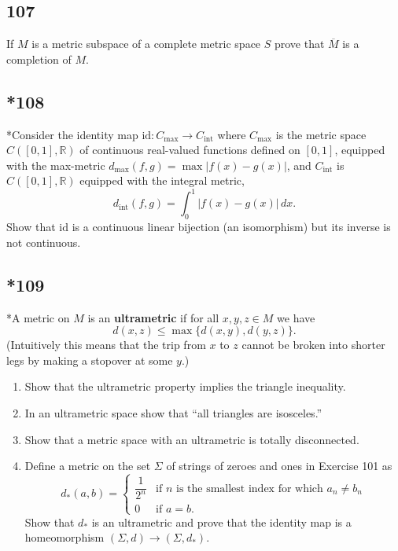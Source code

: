 \documentclass{amsart}
\begin{document}
\subsection*{107}
If $M$ is a metric subspace of a complete metric space $S$ prove that $\overline{M}$ is a completion of $M$.

\subsection*{*108}
*Consider the identity map $\mathrm{id} : C_{\max} \to C_{\mathrm{int}}$ where $C_{\max}$ is the metric space $C([0,1],\mathbb{R})$ of continuous real-valued functions defined on $[0,1]$, equipped with the max-metric $d_{\max}(f,g) = \max|f(x)-g(x)|$, and $C_{\mathrm{int}}$ is $C([0,1],\mathbb{R})$ equipped with the integral metric,
\[
d_{\mathrm{int}}(f,g) = \int_0^1 |f(x)-g(x)|\,dx.
\]
Show that $\mathrm{id}$ is a continuous linear bijection (an isomorphism) but its inverse is not continuous.

\subsection*{*109}
*A metric on $M$ is an \textbf{ultrametric} if for all $x,y,z \in M$ we have
\[
d(x,z) \le \max\{d(x,y), d(y,z)\}.
\]
(Intuitively this means that the trip from $x$ to $z$ cannot be broken into shorter legs by making a stopover at some $y$.)
\begin{enumerate}[label=(\alph*)]
\item Show that the ultrametric property implies the triangle inequality.
\item In an ultrametric space show that ``all triangles are isosceles.''
\item Show that a metric space with an ultrametric is totally disconnected.
\item Define a metric on the set $\Sigma$ of strings of zeroes and ones in Exercise 101 as
\[
d_*(a,b) =
\begin{cases}
\dfrac{1}{2^n} & \text{if } n \text{ is the smallest index for which } a_n \ne b_n \\[6pt]
0 & \text{if } a = b.
\end{cases}
\]
Show that $d_*$ is an ultrametric and prove that the identity map is a homeomorphism $(\Sigma, d) \to (\Sigma, d_*)$.
\end{enumerate}
\end{document}
